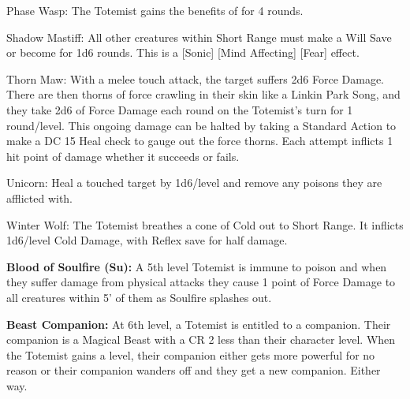 \begin{description*}
\item[Phase Wasp:] The Totemist gains the benefits of  for 4 rounds.
\item[Shadow Mastiff:] All other creatures within Short Range must make a Will Save or become  for 1d6 rounds. This is a [Sonic] [Mind Affecting] [Fear] effect.
\item[Thorn Maw:] With a melee touch attack, the target suffers 2d6 Force Damage. There are then thorns of force crawling in their skin like a Linkin Park Song, and they take 2d6 of Force Damage each round on the Totemist's turn for 1 round/level. This ongoing damage can be halted by taking a Standard Action to make a DC 15 Heal check to gauge out the force thorns. Each attempt inflicts 1 hit point of damage whether it succeeds or fails.
\item[Unicorn:] Heal a touched target by 1d6/level and remove any poisons they are afflicted with.
\item[Winter Wolf:] The Totemist breathes a cone of Cold out to Short Range. It inflicts 1d6/level Cold Damage, with Reflex save for half damage.
\end{description*}

\textbf{Blood of Soulfire (Su):} A 5th level Totemist is immune to poison and when they suffer damage from physical attacks they cause 1 point of Force Damage to all creatures within 5' of them as Soulfire splashes out.

\textbf{Beast Companion:} At 6th level, a Totemist is entitled to a companion. Their companion is a Magical Beast with a CR 2 less than their character level. When the Totemist gains a level, their companion either gets more powerful for no reason or their companion wanders off and they get a new companion. Either way.

